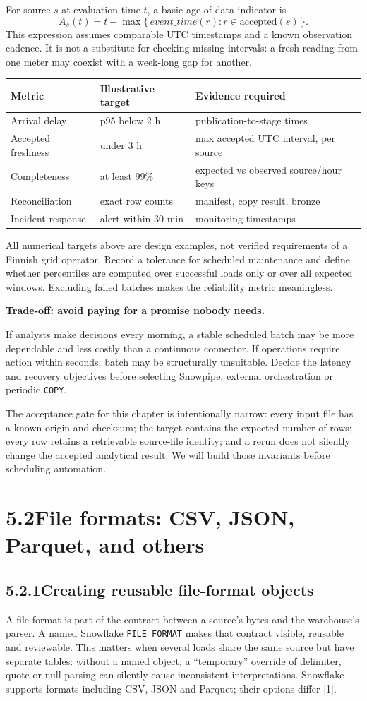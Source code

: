 \documentclass[11pt,twoside]{article}
\newcommand{\topic}[2]{\subsection*{#1\quad #2}}
\begin{document}
For source $s$ at evaluation time $t$, a basic age-of-data indicator is
\[
 A_s(t)=t-\max\{\,event\_time(r):r\in\mathrm{accepted}(s)\,\}.
\]
This expression assumes comparable UTC timestamps and a known observation cadence. It is not a substitute for checking missing intervals: a fresh reading from one meter may coexist with a week-long gap for another.

\begin{center}\small\begin{tabularx}{\linewidth}{@{}p{31mm}p{27mm}X@{}}\toprule
Metric & Illustrative target & Evidence required\\\midrule
Arrival delay & p95 below 2 h & publication-to-stage times\\
Accepted freshness & under 3 h & max accepted UTC interval, per source\\
Completeness & at least 99\% & expected vs observed source/hour keys\\
Reconciliation & exact row counts & manifest, copy result, bronze\\
Incident response & alert within 30 min & monitoring timestamps\\\bottomrule\end{tabularx}\end{center}
All numerical targets above are design examples, not verified requirements of a Finnish grid operator. Record a tolerance for scheduled maintenance and define whether percentiles are computed over successful loads only or over all expected windows. Excluding failed batches makes the reliability metric meaningless.

\begin{insight}\textbf{Trade-off: avoid paying for a promise nobody needs.}\par
If analysts make decisions every morning, a stable scheduled batch may be more dependable and less costly than a continuous connector. If operations require action within seconds, batch may be structurally unsuitable. Decide the latency and recovery objectives before selecting Snowpipe, external orchestration or periodic \texttt{COPY}.\end{insight}
The acceptance gate for this chapter is intentionally narrow: every input file has a known origin and checksum; the target contains the expected number of rows; every row retains a retrievable source-file identity; and a rerun does not silently change the accepted analytical result. We will build those invariants before scheduling automation.
\newpage
\section*{5.2\quad File formats: CSV, JSON, Parquet, and others}
\topic{5.2.1}{Creating reusable file-format objects}
A file format is part of the contract between a source's bytes and the warehouse's parser. A named Snowflake \texttt{FILE FORMAT} makes that contract visible, reusable and reviewable. This matters when several loads share the same source but have separate tables: without a named object, a ``temporary'' override of delimiter, quote or null parsing can silently cause inconsistent interpretations. Snowflake supports formats including CSV, JSON and Parquet; their options differ [1].
\end{document}
